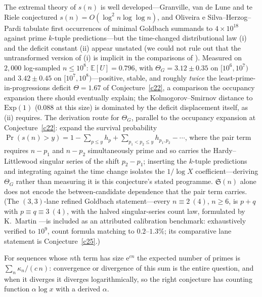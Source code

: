 \documentclass[11pt]{article}
\theoremstyle{definition}
\newcommand{\e}{\mathrm{e}}
\newcommand{\SG}{\mathfrak S}
\begin{document}
The extremal theory of $s(n)$ is well developed---Granville, van de
Lune and te Riele conjectured $s(n)=O(\log^2n\log\log n)$, and
Oliveira e Silva--Herzog--Pardi \cite{OSHP} tabulate first
occurrences of minimal Goldbach summands to $4\times10^{18}$ against
prime $k$-tuple predictions---but the time-changed distributional
law (i) and the deficit constant (ii) appear unstated (we could not
rule out that the untransformed version of (i) is implicit in the
comparisons of \cite{OSHP}).  Measured on $2{,}000$
log-sampled $n\le10^8$: $\mathbb E[U]=0.796$, with
$\Theta_G=3.12\pm0.35$ on $[10^6,10^7)$ and $3.42\pm0.45$ on
$[10^7,10^8)$---positive, stable, and roughly \emph{twice} the
least-prime-in-progressions deficit $\Theta=1.67$ of
Conjecture~\ref{c22}, a comparison the occupancy expansion there
should eventually explain; the Kolmogorov--Smirnov distance to
$\mathrm{Exp}(1)$ ($0.088$ at this size) is dominated by the deficit
displacement itself, as (ii) requires.  The derivation route for
$\Theta_G$, parallel to the occupancy expansion at
Conjecture~\ref{c22}: expand the survival probability
$\Pr(s(n)>y)=1-\sum_{p\le y}h_p+\sum_{p_1<p_2\le y}h_{p_1,p_2}
-\cdots$, where the pair term requires $n-p_1$ and $n-p_2$
simultaneously prime and so carries the Hardy--Littlewood singular
series of the shift $p_2-p_1$; inserting the $k$-tuple predictions
and integrating against the time change isolates the $1/\log X$
coefficient---deriving $\Theta_G$ rather than measuring it is this
conjecture's stated programme.  $\SG(n)$ alone does not encode the
between-candidate dependence that the pair term carries.  (The $(3,3)$-lane
refined
Goldbach statement---every $n\equiv2\ (4)$, $n\ge6$,
is $p+q$ with $p\equiv q\equiv3\ (4)$, with the halved
singular-series count law, formulated by K.~Martin
\cite{Martin}---is included as an attributed calibration benchmark:
exhaustively
verified to $10^9$, count formula matching to $0.2$--$1.3\%$; its
comparative lane statement is Conjecture~\ref{c25}.)

For sequences whose $n$th term has size $\e^{cn}$ the expected number of
primes is $\sum_n \kappa_n/(c\,n)$: convergence or divergence of this
sum is the entire question, and when it diverges it diverges
logarithmically, so the right conjecture has counting function
$\alpha\log x$ with a derived $\alpha$.
\end{document}
